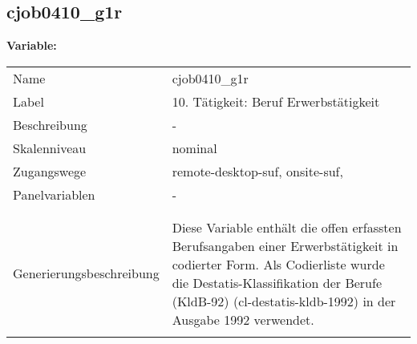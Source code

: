 	
	
	\subsection{cjob0410\_g1r}
	\label{subSection:cjob0410_g1r}

	\noindent\textbf{Variable:}\\
		\begin{tabular}{lL{11.3cm}}
			\label{tableVariable:cjob0410_g1r}
			Name & cjob0410\_g1r \\
			Label & 10. Tätigkeit: Beruf Erwerbstätigkeit \\
			Beschreibung & - \\
			Skalenniveau & nominal \\
			Zugangswege &
				remote-desktop-suf,
				onsite-suf,
 \\
			Panelvariablen & -
			 \\
			 \\
 \\
					Generierungsbeschreibung & Diese Variable enthält die offen erfassten Berufsangaben einer Erwerbstätigkeit in codierter Form. Als Codierliste wurde die Destatis-Klassifikation der Berufe (KldB-92) (cl-destatis-kldb-1992) in der Ausgabe 1992 verwendet. 
				 \\	
			 \\
		\end{tabular}






